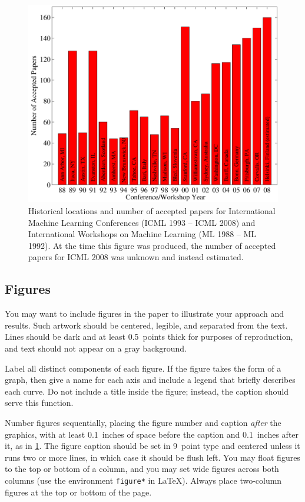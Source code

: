 \documentclass{article}
\theoremstyle{plain}
\theoremstyle{definition}
\theoremstyle{remark}
\begin{document}
\begin{figure}[ht]
  \vskip 0.2in
  \begin{center}
    \centerline{\includegraphics[width=\columnwidth]{icml_numpapers}}
    \caption{
      Historical locations and number of accepted papers for International
      Machine Learning Conferences (ICML 1993 -- ICML 2008) and International
      Workshops on Machine Learning (ML 1988 -- ML 1992). At the time this
      figure was produced, the number of accepted papers for ICML 2008 was
      unknown and instead estimated.
    }
    \label{icml-historical}
  \end{center}
\end{figure}

\subsection{Figures}

You may want to include figures in the paper to illustrate your approach and
results. Such artwork should be centered, legible, and separated from the text.
Lines should be dark and at least 0.5~points thick for purposes of
reproduction, and text should not appear on a gray background.

Label all distinct components of each figure. If the figure takes the form of a
graph, then give a name for each axis and include a legend that briefly
describes each curve. Do not include a title inside the figure; instead, the
caption should serve this function.

Number figures sequentially, placing the figure number and caption \emph{after}
the graphics, with at least 0.1~inches of space before the caption and
0.1~inches after it, as in \cref{icml-historical}. The figure caption should be
set in 9~point type and centered unless it runs two or more lines, in which
case it should be flush left. You may float figures to the top or bottom of a
column, and you may set wide figures across both columns (use the environment
\texttt{figure*} in \LaTeX). Always place two-column figures at the top or
bottom of the page.
\end{document}
